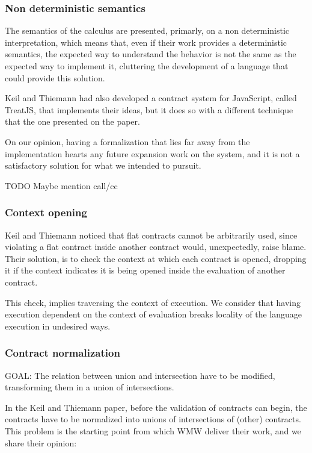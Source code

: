 \subsubsection{Non deterministic semantics}

The semantics of the calculus are presented, primarly, on a non deterministic interpretation,
which means that, even if their work provides a deterministic semantics,
the expected way to understand
the behavior is not the same as the expected way to implement it, cluttering the development
of a language that could provide this solution.

Keil and Thiemann had also developed a contract system for JavaScript, called TreatJS, that
implements their ideas, but it does so with a different technique that the one presented
on the paper.

On our opinion, having a formalization that lies far away from the implementation
hearts any future expansion work on the system, and it is not a satisfactory solution
for what we intended to pursuit.


TODO Maybe mention call/cc

\subsubsection{Context opening}

Keil and Thiemann noticed that flat contracts cannot be arbitrarily used, since
violating a flat contract inside another contract would, unexpectedly, raise blame.
Their solution, is to check the context at which each contract is opened, dropping
it if the context indicates it is being opened inside the evaluation of another
contract.

This check, implies traversing the context of execution.
We consider that having execution dependent on the context
of evaluation breaks locality of
the language execution in undesired ways.

\subsubsection{Contract normalization}

GOAL: The relation between union and intersection have to be modified, transforming them
in a union of intersections.

In the Keil and Thiemann paper, before the validation of contracts can begin, the
contracts have to be normalized into unions of intersections of (other) contracts.
This problem  is the starting point from which
WMW deliver their work, and we share their opinion:

